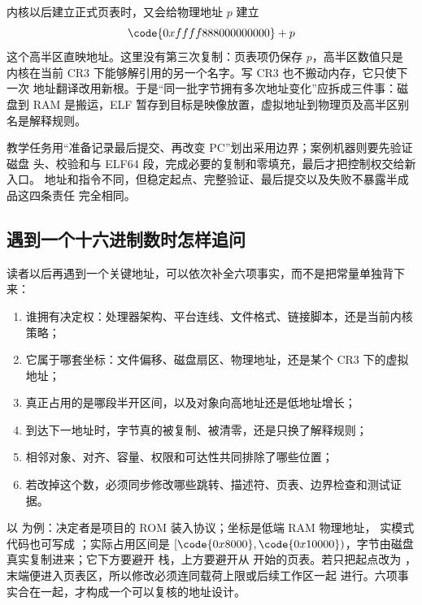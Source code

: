 内核以后建立正式页表时，又会给物理地址 \(p\) 建立
\[
\code{0xffff888000000000}+p
\]
这个高半区直映地址。这里没有第三次复制：页表项仍保存 \(p\)，高半区数值只是
内核在当前 CR3 下能够解引用的另一个名字。写 CR3 也不搬动内存，它只使下一次
地址翻译改用新根。于是“同一批字节拥有多次地址变化”应拆成三件事：磁盘到 RAM
是搬运，ELF 暂存到目标是映像放置，虚拟地址到物理页及高半区别名是解释规则。

教学任务用“准备记录最后提交、再改变 PC”划出采用边界；案例机器则要先验证磁盘
头、校验和与 ELF64 段，完成必要的复制和零填充，最后才把控制权交给新入口。
地址和指令不同，但稳定起点、完整验证、最后提交以及失败不暴露半成品这四条责任
完全相同。

\subsection{遇到一个十六进制数时怎样追问}

读者以后再遇到一个关键地址，可以依次补全六项事实，而不是把常量单独背下来：

\begin{enumerate}
  \item 谁拥有决定权：处理器架构、平台连线、文件格式、链接脚本，还是当前内核策略；
  \item 它属于哪套坐标：文件偏移、磁盘扇区、物理地址，还是某个 CR3 下的虚拟地址；
  \item 真正占用的是哪段半开区间，以及对象向高地址还是低地址增长；
  \item 到达下一地址时，字节真的被复制、被清零，还是只换了解释规则；
  \item 相邻对象、对齐、容量、权限和可达性共同排除了哪些位置；
  \item 若改掉这个数，必须同步修改哪些跳转、描述符、页表、边界检查和测试证据。
\end{enumerate}

以  为例：决定者是项目的 ROM 装入协议；坐标是低端 RAM 物理地址，
实模式代码也可写成 ；实际占用区间是
\([\code{0x8000},\code{0x10000})\)，字节由磁盘真实复制进来；它下方要避开
 栈，上方要避开从  开始的页表。若只把起点改为
，末端便进入页表区，所以修改必须连同载荷上限或后续工作区一起
进行。六项事实合在一起，才构成一个可以复核的地址设计。
